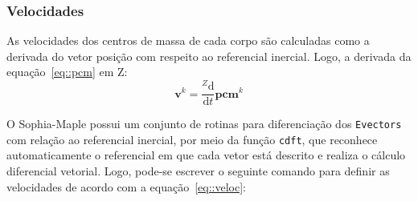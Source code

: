 \subsubsection{Velocidades}

As velocidades dos centros de massa de cada corpo são calculadas como a derivada
do vetor posição com respeito ao referencial inercial. Logo, a derivada da
equação~\ref{eq::pcm} em Z:
%
\begin{equation} \label{eq::veloc}
	\mathbf{v}^{k} = \frac{^{Z}\mathrm{d} }{\mathrm{d} t}
	\mathbf{pcm}^{k} 
\end{equation}
%

O Sophia-Maple possui um conjunto de rotinas para diferenciação dos
\texttt{Evectors} com relação ao referencial inercial, por meio da função
\texttt{cdft}, que reconhece automaticamente o referencial em que cada vetor
está descrito e realiza o cálculo diferencial vetorial. Logo, pode-se escrever o
seguinte comando para definir as velocidades de acordo com a
equação~\ref{eq::veloc}:

\bigskip {} \bigskip 

